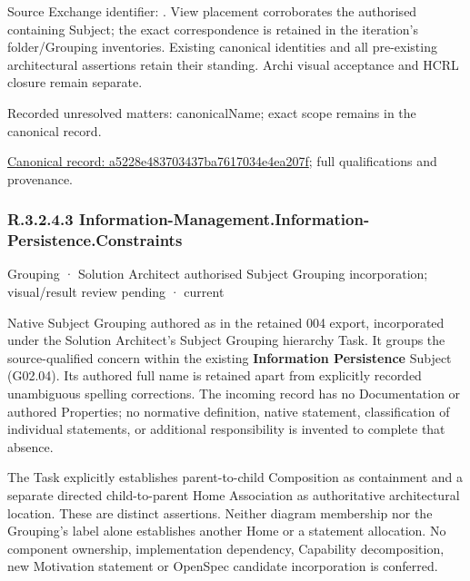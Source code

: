 Source Exchange identifier: \texttt{}. View placement corroborates
the authorised containing Subject; the exact correspondence is retained in the
iteration's folder/Grouping inventories. Existing canonical identities and all
pre-existing architectural assertions retain their standing. Archi visual
acceptance and HCRL closure remain separate.


{\small Recorded unresolved matters: canonicalName; exact scope remains in the canonical record.}\par
{\footnotesize \href{../../../../continuum/grouping/a5228e483703437ba7617034e4ea207f.md}{Canonical record: a5228e483703437ba7617034e4ea207f}; full qualifications and provenance.}\par
\subsubsection*{R.3.2.4.3 Information-Management.Information-Persistence.Constraints}
\label{navigation:R.3.2.4.3}

\label{element:76b2a8e5551e4645a048f48e4820a0bc}
{\small Grouping · Solution Architect authorised Subject Grouping incorporation; visual/result review pending · current}\par

Native Subject Grouping authored as \texttt{} in the retained 004 export,
incorporated under the Solution Architect's Subject Grouping hierarchy Task.
It groups the source-qualified \texttt{} concern within
the existing \textbf{Information Persistence} Subject (G02.04). Its authored full name
is retained apart from explicitly recorded unambiguous spelling corrections.
The incoming record has no Documentation or authored Properties; no normative
definition, native statement, classification of individual statements, or
additional responsibility is invented to complete that absence.



The Task explicitly establishes parent-to-child Composition as containment and
a separate directed child-to-parent Home Association as authoritative architectural
location. These are distinct assertions. Neither diagram membership nor the
Grouping's label alone establishes another Home or a statement allocation.
No component ownership, implementation dependency, Capability decomposition,
new Motivation statement or OpenSpec candidate incorporation is conferred.



